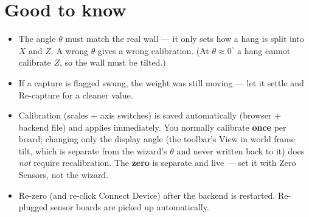 \documentclass[11pt,a4paper]{article}
\begin{document}
\section{Good to know}
\begin{itemize}
  \item The angle $\theta$ must match the real wall --- it only sets how a hang is
        split into $X$ and $Z$. A wrong $\theta$ gives a wrong calibration. (At
        $\theta\approx 0^\circ$ a hang cannot calibrate $Z$, so the wall must be
        tilted.)
  \item If a capture is flagged \textsf{swung}, the weight was still moving ---
        let it settle and \textsf{Re-capture} for a cleaner value.
  \item Calibration (scales $+$ axis switches) is saved automatically (browser +
        backend file) and applies immediately. You normally calibrate \textbf{once}
        per board; changing only the display angle (the toolbar's \textsf{View in
        world frame} tilt, which is separate from the wizard's $\theta$ and never
        written back to it) does \emph{not} require recalibration. The
        \textbf{zero} is separate and live --- set it with \textsf{Zero Sensors},
        not the wizard.
  \item Re-zero (and re-click \textsf{Connect Device}) after the backend is
        restarted. Re-plugged sensor boards are picked up automatically.
\end{itemize}
\end{document}
